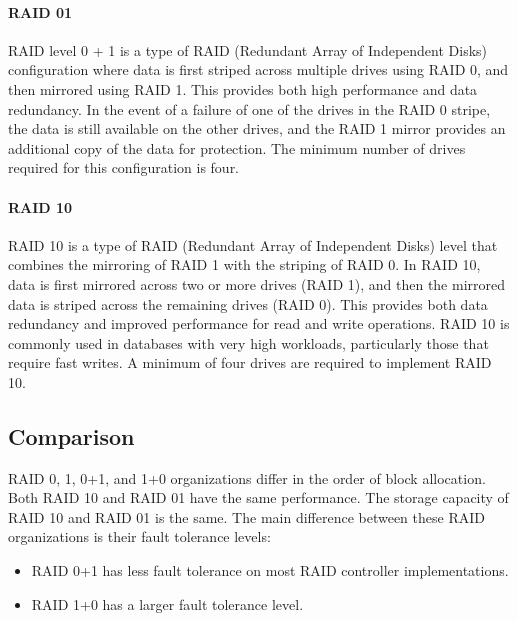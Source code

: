 \paragraph*{RAID 01}
RAID level 0 + 1 is a type of RAID (Redundant Array of Independent Disks) configuration where data is first striped across multiple drives using RAID 0, and then mirrored using RAID 1. 
This provides both high performance and data redundancy. 
In the event of a failure of one of the drives in the RAID 0 stripe, the data is still available on the other drives, and the RAID 1 mirror provides an additional copy of the data for protection. 
The minimum number of drives required for this configuration is four.

\paragraph*{RAID 10}
RAID 10 is a type of RAID (Redundant Array of Independent Disks) level that combines the mirroring of RAID 1 with the striping of RAID 0. 
In RAID 10, data is first mirrored across two or more drives (RAID 1), and then the mirrored data is striped across the remaining drives (RAID 0). 
This provides both data redundancy and improved performance for read and write operations.
RAID 10 is commonly used in databases with very high workloads, particularly those that require fast writes.
A minimum of four drives are required to implement RAID 10.

\subsection{Comparison}
RAID 0, 1, 0+1, and 1+0 organizations differ in the order of block allocation.
Both RAID 10 and RAID 01 have the same performance. 
The storage capacity of RAID 10 and RAID 01 is the same.
The main difference between these RAID organizations is their fault tolerance levels:
\begin{itemize}
    \item RAID 0+1 has less fault tolerance on most RAID controller implementations.
    \item RAID 1+0 has a larger fault tolerance level.
\end{itemize}

